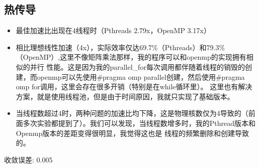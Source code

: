 \documentclass{SYSUReport}
\begin{document}
\subsection{热传导}
\begin{itemize}
\item 最佳加速比出现在4线程时（Pthreads 2.79x，OpenMP 3.17x）
\item 相比理想线性加速（4x），实际效率仅达69.7\%（Pthreads）和79.3\%（OpenMP）,这里不像矩阵乘法那样，我的程序可以和openmp的实现拥有相似的并行
性能。这是因为我的parallel\_for每次调用都伴随着线程的销毁的创建，而openmp可以先使用\#pragma omp parallel创建，然后使用\#pragma omp for调用，这里会存在很多开销（特别是在while循环里）。
这里也有解决方案，就是使用线程池，但是由于时间原因，我就只实现了基础版本。
\item 当线程数超过4时，两种问题的加速比均下降，这是物理核数仅为4导致的（前面多次实验都提到了）。我们可以发现，当线程数增多时，我的Pthread版本和Openmp版本的差距变得很明显，我觉得这也是
线程的频繁删除和创建导致的。
\end{itemize}


\begin{table}[h!]
\centering
\caption{热传导性能对比 (Pthreads vs OpenMP, 网格尺寸: 500×500)}
\footnotesize 收敛误差: 0.005
\label{tab:heat_performance_final}
\end{table}
\end{document}
